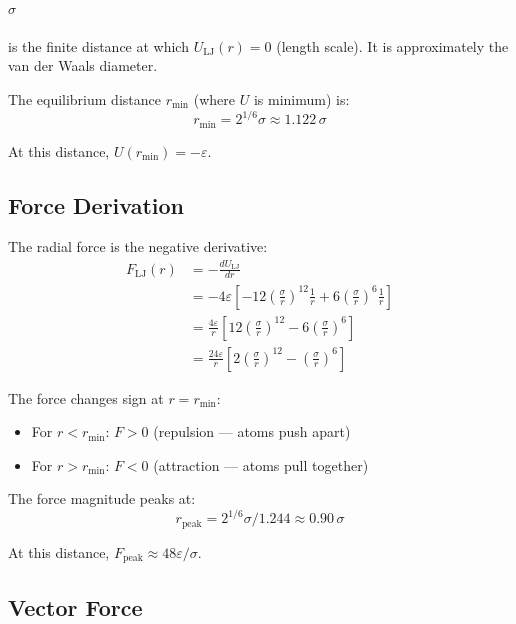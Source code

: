 \documentclass[11pt]{article}
\begin{document}
\paragraph{$\sigma$} is the finite distance at which $U_{\text{LJ}}(r) = 0$ (length scale). It is approximately the van der Waals diameter.

The equilibrium distance $r_{\min}$ (where $U$ is minimum) is:
\begin{equation}
r_{\min} = 2^{1/6} \sigma \approx 1.122\,\sigma
\end{equation}

At this distance, $U(r_{\min}) = -\varepsilon$.

\subsection{Force Derivation}

The radial force is the negative derivative:
\begin{align}
F_{\text{LJ}}(r) &= -\frac{dU_{\text{LJ}}}{dr} \\
&= -4\varepsilon \left[-12\left(\frac{\sigma}{r}\right)^{12} \frac{1}{r} + 6\left(\frac{\sigma}{r}\right)^6 \frac{1}{r}\right] \\
&= \frac{4\varepsilon}{r} \left[12\left(\frac{\sigma}{r}\right)^{12} - 6\left(\frac{\sigma}{r}\right)^6\right] \\
&= \frac{24\varepsilon}{r} \left[2\left(\frac{\sigma}{r}\right)^{12} - \left(\frac{\sigma}{r}\right)^6\right]
\end{align}

The force changes sign at $r = r_{\min}$:
\begin{itemize}
\item For $r < r_{\min}$: $F > 0$ (repulsion — atoms push apart)
\item For $r > r_{\min}$: $F < 0$ (attraction — atoms pull together)
\end{itemize}

The force magnitude peaks at:
\begin{equation}
r_{\text{peak}} = 2^{1/6} \sigma / 1.244 \approx 0.90\,\sigma
\end{equation}

At this distance, $F_{\text{peak}} \approx 48\varepsilon/\sigma$.

\subsection{Vector Force}
\end{document}
